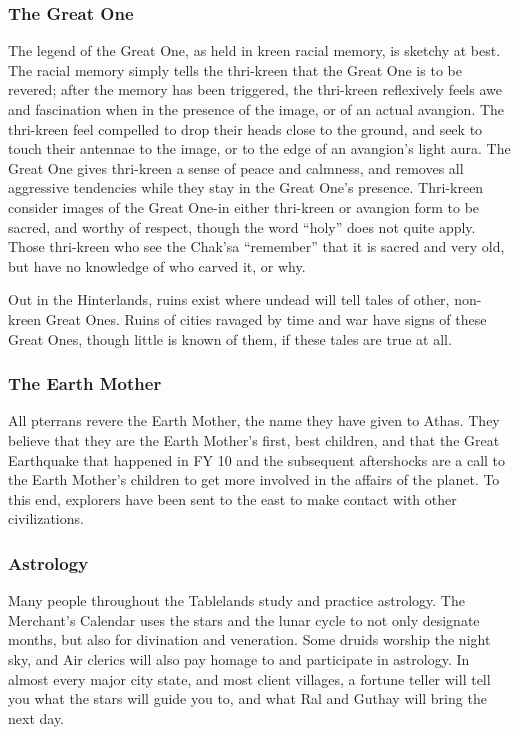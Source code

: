 \subsubsection{The Great One}
The legend of the Great One, as held in kreen racial memory, is sketchy at best. The racial memory simply tells the thri-kreen that the Great One is to be revered; after the memory has been triggered, the thri-kreen reflexively feels awe and fascination when in the presence of the image, or of an actual avangion. The thri-kreen feel compelled to drop their heads close to the ground, and seek to touch their antennae to the image, or to the edge of an avangion's light aura. The Great One gives thri-kreen a sense of peace and calmness, and removes all aggressive tendencies while they stay in the Great One's presence. Thri-kreen consider images of the Great One-in either thri-kreen or avangion form to be sacred, and worthy of respect, though the word ``holy'' does not quite apply. Those thri-kreen who see the Chak'sa ``remember'' that it is sacred and very old, but have no knowledge of who carved it, or why.

Out in the Hinterlands, ruins exist where undead will tell tales of other, non-kreen Great Ones. Ruins of cities ravaged by time and war have signs of these Great Ones, though little is known of them, if these tales are true at all.

\subsubsection{The Earth Mother}
All pterrans revere the Earth Mother, the name they have given to Athas. They believe that they are the Earth Mother's first, best children, and that the Great Earthquake that happened in FY 10 and the subsequent aftershocks are a call to the Earth Mother's children to get more involved in the affairs of the planet. To this end, explorers have been sent to the east to make contact with other civilizations.

\subsubsection{Astrology}
Many people throughout the Tablelands study and practice astrology. The Merchant's Calendar uses the stars and the lunar cycle to not only designate months, but also for divination and veneration. Some druids worship the night sky, and Air clerics will also pay homage to and participate in astrology. In almost every major city state, and most client villages, a fortune teller will tell you what the stars will guide you to, and what Ral and Guthay will bring the next day.


